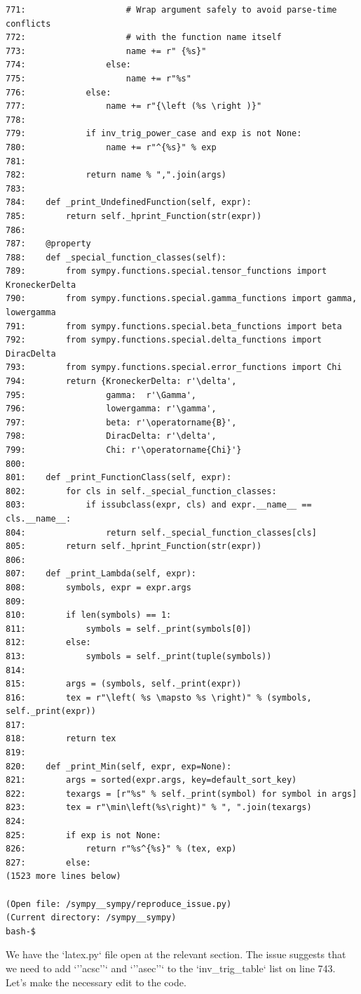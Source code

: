 {\begin{observationbox}
\begin{Verbatim}[breaklines=true, breakanywhere=true]
771:                    # Wrap argument safely to avoid parse-time conflicts
772:                    # with the function name itself
773:                    name += r" {%s}"
774:                else:
775:                    name += r"%s"
776:            else:
777:                name += r"{\left (%s \right )}"
778:
779:            if inv_trig_power_case and exp is not None:
780:                name += r"^{%s}" % exp
781:
782:            return name % ",".join(args)
783:
784:    def _print_UndefinedFunction(self, expr):
785:        return self._hprint_Function(str(expr))
786:
787:    @property
788:    def _special_function_classes(self):
789:        from sympy.functions.special.tensor_functions import KroneckerDelta
790:        from sympy.functions.special.gamma_functions import gamma, lowergamma
791:        from sympy.functions.special.beta_functions import beta
792:        from sympy.functions.special.delta_functions import DiracDelta
793:        from sympy.functions.special.error_functions import Chi
794:        return {KroneckerDelta: r'\delta',
795:                gamma:  r'\Gamma',
796:                lowergamma: r'\gamma',
797:                beta: r'\operatorname{B}',
798:                DiracDelta: r'\delta',
799:                Chi: r'\operatorname{Chi}'}
800:
801:    def _print_FunctionClass(self, expr):
802:        for cls in self._special_function_classes:
803:            if issubclass(expr, cls) and expr.__name__ == cls.__name__:
804:                return self._special_function_classes[cls]
805:        return self._hprint_Function(str(expr))
806:
807:    def _print_Lambda(self, expr):
808:        symbols, expr = expr.args
809:
810:        if len(symbols) == 1:
811:            symbols = self._print(symbols[0])
812:        else:
813:            symbols = self._print(tuple(symbols))
814:
815:        args = (symbols, self._print(expr))
816:        tex = r"\left( %s \mapsto %s \right)" % (symbols, self._print(expr))
817:
818:        return tex
819:
820:    def _print_Min(self, expr, exp=None):
821:        args = sorted(expr.args, key=default_sort_key)
822:        texargs = [r"%s" % self._print(symbol) for symbol in args]
823:        tex = r"\min\left(%s\right)" % ", ".join(texargs)
824:
825:        if exp is not None:
826:            return r"%s^{%s}" % (tex, exp)
827:        else:
(1523 more lines below)

(Open file: /sympy__sympy/reproduce_issue.py)
(Current directory: /sympy__sympy)
bash-$
\end{Verbatim}
\end{observationbox}
\begin{agentbox}
We have the `latex.py` file open at the relevant section. The issue suggests that we need to add `''acsc''` and `''asec''` to the `inv\_trig\_table` list on line 743. Let's make the necessary edit to the code.




\end{agentbox}}
